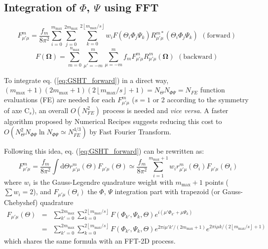 \subsection{Integration of $\Phi$, $\Psi$ using FFT}

\[
F_{\mu'\mu}^{m}=\frac{f_{m}}{8\pi^{2}}\sum_{i=0}^{m_{\mathrm{max}}}\sum_{j=0}^{2m_{\mathrm{max}}}\sum_{k=0}^{2\left\lfloor m_{\mathrm{max}}/s\right\rfloor }w_{i}F(\Theta_{i}\Phi_{j}\Psi_{k})R_{\mu'\mu}^{m*}(\Theta_{i}\Phi_{j}\Psi_{k})\begin{array}{c}
\mathrm{(forward)}\end{array}
\]
\[
F(\mathbf{\Omega})=\sum_{m=0}^{n_{\mathrm{max}}}\sum_{\mu'=-m}^{m}\sum_{\mu=-m}^{m}f_{m}F_{\mu'\mu}^{m}R_{\mu'\mu}^{m}(\mathbf{\Omega})\begin{array}{c}
\mathrm{(backward)}\end{array}
\]


To integrate eq. (\ref{eq:GSHT_forward}) in a direct way, $(m_{\mathrm{max}}+1)(2m_{\mathrm{max}}+1)(2\left\lfloor m_{\mathrm{max}}/s\right\rfloor +1)=N_{\Theta}N_{\Phi\Psi}=N_{FE}$
function evaluations (FE) are needed for each $F_{\mu'\mu}^{m}$ ($s=1$
or 2 according to the symmetry of axe $\mathrm{C}_{s}$), an overall %
$O(N_{FE}^{2})$ process is needed and \textit{vice versa}. A faster
algorithm proposed by Numerical Recipes \citep{Numerical_Recipes_3ed}
suggests reducing this cost to $O(N_{\Theta}^{2}N_{\Phi\Psi}\ln N_{\Phi\Psi}\simeq N_{FE}^{4/3})$
by Fast Fourier Transform.

Following this idea, eq. (\ref{eq:GSHT_forward}) can be rewritten
as:
\begin{equation}
F_{\mu'\mu}^{m}=\frac{f_{m}}{8\pi^{2}}\int\mathrm{d}\Theta r_{\mu'\mu}^{m}(\Theta)F_{\mu'\mu}(\Theta)\simeq\frac{f_{m}}{8\pi^{2}}\sum_{i=1}^{m_{\mathrm{max}}+1}w_{i}r_{\mu'\mu}^{m}(\Theta_{i})F_{\mu'\mu}(\Theta_{i})
\end{equation}
where $w_{i}$ is the Gauss-Legendre quadrature weight with $m_{\mathrm{max}}+1$
points ($\sum w_{i}=2$), and $F_{\mu'\mu}(\Theta_{i})$ the $\Phi$,
$\Psi$ integration part with trapezoid (or Gauss-Chebyshef) quadrature
\begin{eqnarray}
F_{\mu'\mu}(\Theta) & = & \sum_{k'=0}^{2m_{\mathrm{max}}}\sum_{k=0}^{2\left\lfloor m_{\mathrm{max}}/s\right\rfloor }F(\Phi_{k'},\Psi_{k},\Theta)e^{i(\mu'\Phi_{k'}+\mu\Psi_{k})}\label{eq:f_mup_mu}\\
 & = & \sum_{k'=0}^{2m_{\mathrm{max}}}\sum_{k=0}^{2\left\lfloor m_{\mathrm{max}}/s\right\rfloor }F(\Phi_{k'},\Psi_{k},\Theta)e^{2\pi i\mu'k'/(2m_{\mathrm{max}}+1)}e^{2\pi i\mu k/(2\left\lfloor m_{\mathrm{max}}/s\right\rfloor +1)}\nonumber 
\end{eqnarray}
which shares the same formula with an FFT-2D process.

